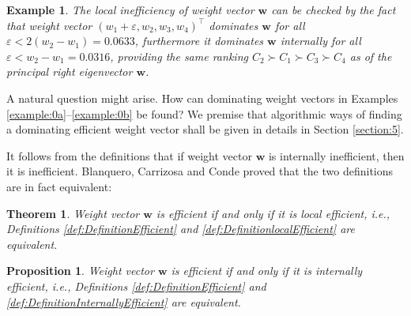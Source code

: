 \documentclass{article}
\theoremstyle{plain}
\newtheorem{example}{Example}[section]
\newtheorem{proposition}{Proposition}[section]
\newtheorem{theorem}{Theorem}[section]
\begin{document}
\begin{example}
The local inef{\kern0pt}f{\kern0pt}iciency of weight vector ${\mathbf{w}}$ can be checked by the
fact that weight vector $(w_1+\varepsilon,w_2,w_3,w_4)^{\top}$ dominates ${\mathbf{w}}$ for all
$\varepsilon < 2(w_2 - w_1) = 0.0633$, furthermore it dominates ${\mathbf{w}}$ internally for all
$\varepsilon < w_2 - w_1 = 0.0316$, providing the same ranking $C_2 \succ C_1 \succ C_3 \succ C_4$
as of the principal right eigenvector ${\mathbf{w}}$.
\end{example}

A natural question might arise. How can dominating weight vectors in Examples \ref{example:0a}--\ref{example:0b}
be found? We premise that algorithmic ways of f{\kern0pt}inding a dominating ef{\kern0pt}f{\kern0pt}icient weight vector
shall be given in details in Section \ref{section:5}.

It follows from the def{\kern0pt}initions that if
weight vector $\mathbf{w}$ is internally inef{\kern0pt}f{\kern0pt}icient, then
it is inef{\kern0pt}f{\kern0pt}icient.
Blanquero, Carrizosa and Conde proved that the two def{\kern0pt}initions are in fact equivalent:

\begin{theorem} \label{theorem:EfficientlocalEfficient}
\cite[Theorem 3]{BlanqueroCarrizosaConde2006}
Weight vector $\mathbf{w}$ is ef{\kern0pt}f{\kern0pt}icient if and only if it is local ef{\kern0pt}f{\kern0pt}icient,
i.e., Def{\kern0pt}initions \ref{def:DefinitionEfficient} and \ref{def:DefinitionlocalEfficient}
are equivalent.
\end{theorem}

\begin{proposition} \label{proposition:EfficientInternallyEfficient}
Weight vector $\mathbf{w}$ is ef{\kern0pt}f{\kern0pt}icient if and only if it is internally ef{\kern0pt}f{\kern0pt}icient,
i.e., Def{\kern0pt}initions \ref{def:DefinitionEfficient} and \ref{def:DefinitionInternallyEfficient}
are equivalent.
\end{proposition}
\end{document}
